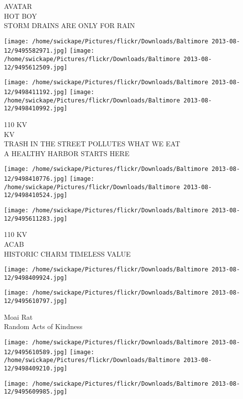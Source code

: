 \documentclass[10pt,letterpaper]{article}
\begin{document}
AVATAR\\
HOT BOY\\
STORM DRAINS ARE ONLY FOR RAIN\\
\pagebreak

\texttt{[image: /home/swickape/Pictures/flickr/Downloads/Baltimore 2013-08-12/9495582971.jpg]}
\texttt{[image: /home/swickape/Pictures/flickr/Downloads/Baltimore 2013-08-12/9495612509.jpg]}

\texttt{[image: /home/swickape/Pictures/flickr/Downloads/Baltimore 2013-08-12/9498411192.jpg]}
\texttt{[image: /home/swickape/Pictures/flickr/Downloads/Baltimore 2013-08-12/9498410992.jpg]}

110 KV\\
KV\\
TRASH IN THE STREET POLLUTES WHAT WE EAT\\
A HEALTHY HARBOR STARTS HERE\\
\pagebreak

\texttt{[image: /home/swickape/Pictures/flickr/Downloads/Baltimore 2013-08-12/9498410776.jpg]}
\texttt{[image: /home/swickape/Pictures/flickr/Downloads/Baltimore 2013-08-12/9498410524.jpg]}

\vspace{0.25in}
\texttt{[image: /home/swickape/Pictures/flickr/Downloads/Baltimore 2013-08-12/9495611283.jpg]}

110 KV\\
ACAB\\
HISTORIC CHARM TIMELESS VALUE\\
\pagebreak

\texttt{[image: /home/swickape/Pictures/flickr/Downloads/Baltimore 2013-08-12/9498409924.jpg]}

\vspace{0.25in}
\texttt{[image: /home/swickape/Pictures/flickr/Downloads/Baltimore 2013-08-12/9495610797.jpg]}

Moai Rat\\
Random Acts of Kindness\\
\pagebreak

\texttt{[image: /home/swickape/Pictures/flickr/Downloads/Baltimore 2013-08-12/9495610589.jpg]}
\texttt{[image: /home/swickape/Pictures/flickr/Downloads/Baltimore 2013-08-12/9498409210.jpg]}

\texttt{[image: /home/swickape/Pictures/flickr/Downloads/Baltimore 2013-08-12/9495609985.jpg]}
\end{document}
